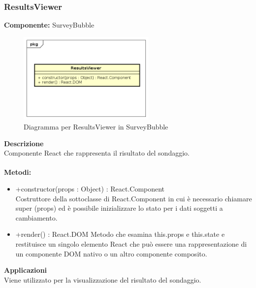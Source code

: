 \subsubsection{ResultsViewer}
\textbf{Componente:}  SurveyBubble\\
   \FloatBarrier
   \begin{figure}[ht]
   \centering
   \includegraphics[width=0.6\textwidth]{img/single-ResultsViewer}
   \caption{{Diagramma per ResultsViewer in SurveyBubble}}
\end{figure}
\FloatBarrier
\textbf{Descrizione}\\
Componente React che rappresenta il risultato del sondaggio.
\\
\\
\textbf{Metodi:} 
\begin{itemize}
\item +constructor(props : Object) : React.Component 
\\
Costruttore della sottoclasse di React.Component in cui è necessario chiamare super (props) ed è possibile inizializzare lo stato per i dati soggetti a cambiamento.

\item +render() : React.DOM
Metodo che esamina this.props e this.state e restituisce un singolo elemento React che può essere una rappresentazione di un componente DOM nativo o un altro componente composito.

\end{itemize} 


\textbf{Applicazioni}\\
Viene utilizzato per la visualizzazione del risultato del sondaggio. 


\clearpage

